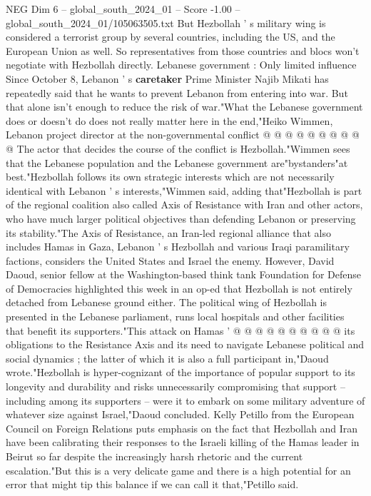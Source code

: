\begin{textsample}{NEG Dim 6 – global\_south\_2024\_01 – Score -1.00 – global\_south\_2024\_01/105063505.txt}
But Hezbollah ' s military wing is considered a terrorist group by several countries, including the US, and the European Union as well.
So representatives from those countries and blocs won't negotiate with Hezbollah directly.
Lebanese government : Only limited influence Since October 8, Lebanon ' s \textbf{caretaker} Prime Minister Najib Mikati has repeatedly said that he wants to prevent Lebanon from entering into war.
But that alone isn't enough to reduce the risk of war."What the Lebanese government does or doesn't do does not really matter here in the end,"Heiko Wimmen, Lebanon project director at the non-governmental conflict @ @ @ @ @ @ @ @ @ @ The actor that decides the course of the conflict is Hezbollah."Wimmen sees that the Lebanese population and the Lebanese government are"bystanders"at best."Hezbollah follows its own strategic interests which are not necessarily identical with Lebanon ' s interests,"Wimmen said, adding that"Hezbollah is part of the regional coalition also called Axis of Resistance with Iran and other actors, who have much larger political objectives than defending Lebanon or preserving its stability."The Axis of Resistance, an Iran-led regional alliance that also includes Hamas in Gaza, Lebanon ' s Hezbollah and various Iraqi paramilitary factions, considers the United States and Israel the enemy.
However, David Daoud, senior fellow at the Washington-based think tank Foundation for Defense of Democracies highlighted this week in an op-ed that Hezbollah is not entirely detached from Lebanese ground either.
The political wing of Hezbollah is presented in the Lebanese parliament, runs local hospitals and other facilities that benefit its supporters."This attack on Hamas ' @ @ @ @ @ @ @ @ @ @ its obligations to the Resistance Axis and its need to navigate Lebanese political and social dynamics ; the latter of which it is also a full participant in,"Daoud wrote."Hezbollah is hyper-cognizant of the importance of popular support to its longevity and durability and risks unnecessarily compromising that support -- including among its supporters -- were it to embark on some military adventure of whatever size against Israel,"Daoud concluded.
Kelly Petillo from the European Council on Foreign Relations puts emphasis on the fact that Hezbollah and Iran have been calibrating their responses to the Israeli killing of the Hamas leader in Beirut so far despite the increasingly harsh rhetoric and the current escalation."But this is a very delicate game and there is a high potential for an error that might tip this balance if we can call it that,"Petillo said.

\end{textsample}

